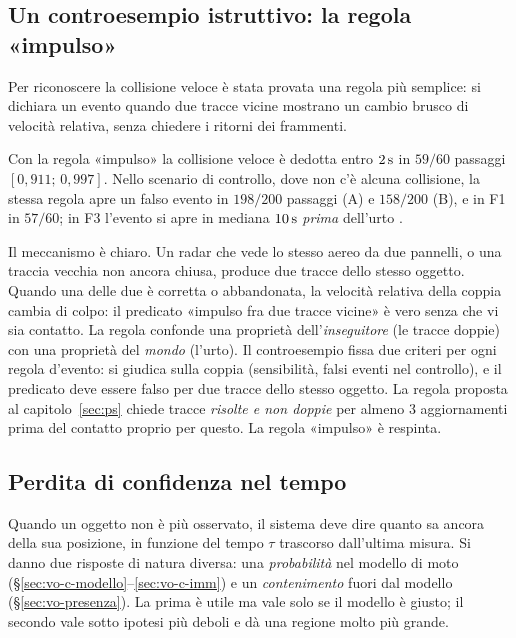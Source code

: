 \subsection{Un controesempio istruttivo: la regola «impulso»}\label{sec:vo-impulso}

Per riconoscere la collisione veloce è stata provata una regola più semplice: si dichiara un evento quando due tracce vicine mostrano un cambio brusco di velocità relativa, senza chiedere i ritorni dei frammenti.

\begin{controesempio}\label{ce:vo-impulso}
Con la regola «impulso» la collisione veloce è dedotta entro $2\,\mathrm{s}$ in $59/60$ passaggi $[0{,}911;\,0{,}997]$. Nello scenario di controllo, dove non c'è alcuna collisione, la stessa regola apre un falso evento in $198/200$ passaggi (A) e $158/200$ (B), e in F1 in $57/60$; in F3 l'evento si apre in mediana $10\,\mathrm{s}$ \emph{prima} dell'urto .
\end{controesempio}
Il meccanismo è chiaro. Un radar che vede lo stesso aereo da due pannelli, o una traccia vecchia non ancora chiusa, produce due tracce dello stesso oggetto. Quando una delle due è corretta o abbandonata, la velocità relativa della coppia cambia di colpo: il predicato «impulso fra due tracce vicine» è vero senza che vi sia contatto. La regola confonde una proprietà dell'\emph{inseguitore} (le tracce doppie) con una proprietà del \emph{mondo} (l'urto). Il controesempio fissa due criteri per ogni regola d'evento: si giudica sulla coppia (sensibilità, falsi eventi nel controllo), e il predicato deve essere falso per due tracce dello stesso oggetto. La regola proposta al capitolo~\ref{sec:ps} chiede tracce \emph{risolte e non doppie} per almeno 3 aggiornamenti prima del contatto proprio per questo. La regola «impulso» è respinta.

\subsection{Perdita di confidenza nel tempo}\label{sec:vo-confidenza}

Quando un oggetto non è più osservato, il sistema deve dire quanto sa ancora della sua posizione, in funzione del tempo $\tau$ trascorso dall'ultima misura. Si danno due risposte di natura diversa: una \emph{probabilità} nel modello di moto (\S\ref{sec:vo-c-modello}--\ref{sec:vo-c-imm}) e un \emph{contenimento} fuori dal modello (\S\ref{sec:vo-presenza}). La prima è utile ma vale solo se il modello è giusto; il secondo vale sotto ipotesi più deboli e dà una regione molto più grande.


